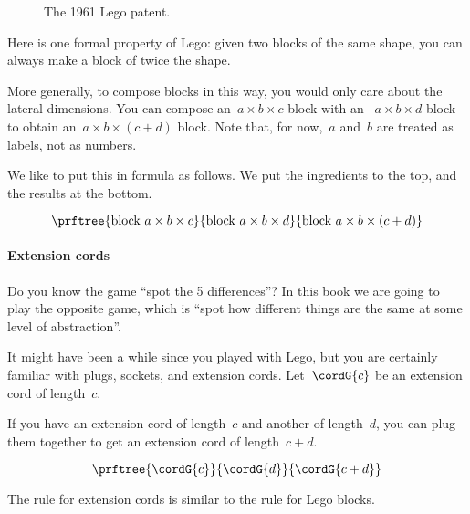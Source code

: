 \begin{figure}[p]
  \centering
%
  \caption{The 1961 Lego patent.}
\end{figure}
Here is one formal property of Lego: given two blocks of the same shape, you can always make a block of twice the shape.

More generally, to compose blocks in this way, you would only care about the lateral dimensions.
You can compose an~$a \times b \times c$ block with an ~$a \times b \times d$ block to obtain an~$a \times b \times( c + d)$ block.
Note that, for now,~$a$ and~$b$ are treated as labels, not as numbers.

We like to put this in formula as follows. We put the ingredients to the top, and the results at the bottom.

\begin{equation}
  \prftree{\text{block } a \times b \times c}{\text{block } a \times b \times d }{%
    \text{block } a \times b \times (c+d)
  }
\end{equation}

\paragraph{Extension cords}

Do you know the game ``spot the 5 differences''? In this book we are going to play the opposite game, which is ``spot how different things are the same at some level of abstraction''.

It might have been a while since you played with Lego, but you are certainly familiar with plugs, sockets, and extension cords.
Let~$\cordG{c}$ be an extension cord of length~$c$.

If you have an extension cord of length~$c$ and another of length~$d$, you can plug them together to get an extension cord of length~$c+d$.

\begin{equation}
  \prftree{\cordG{c}}{\cordG{d}}{\cordG{c+d}}
\end{equation}

The rule for extension cords is similar to the rule for Lego blocks.
%


